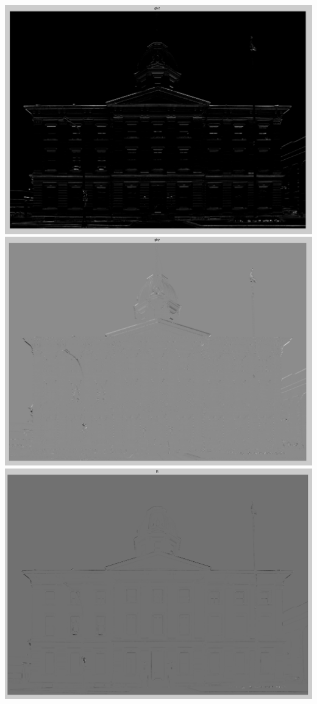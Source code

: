 \documentclass[11pt]{article}
\begin{document}
\includegraphics[scale=0.5]{gly2}
\includegraphics[scale=0.5]{glxy}
\includegraphics[scale=0.5]{R}
\end{document}
